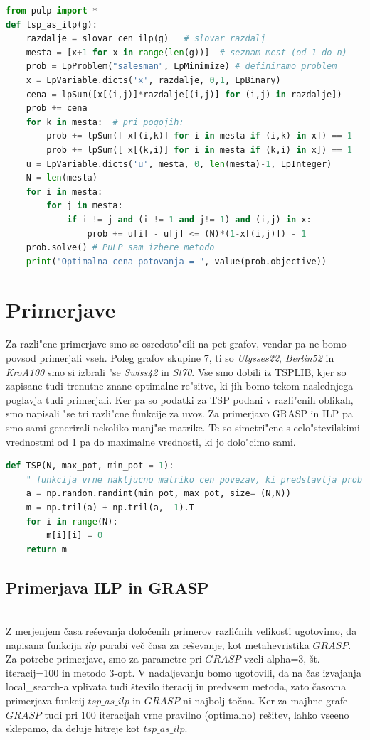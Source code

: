 \documentclass[12pt,a4paper]{amsart}
\theoremstyle{definition} %
\theoremstyle{plain} %
\begin{document}
\begin{lstlisting}[language=Python]
from pulp import *
def tsp_as_ilp(g):
    razdalje = slovar_cen_ilp(g)   # slovar razdalj 
    mesta = [x+1 for x in range(len(g))]  # seznam mest (od 1 do n)
    prob = LpProblem("salesman", LpMinimize) # definiramo problem
    x = LpVariable.dicts('x', razdalje, 0,1, LpBinary) 
    cena = lpSum([x[(i,j)]*razdalje[(i,j)] for (i,j) in razdalje]) 
    prob += cena
    for k in mesta:  # pri pogojih:
        prob += lpSum([ x[(i,k)] for i in mesta if (i,k) in x]) == 1  
        prob += lpSum([ x[(k,i)] for i in mesta if (k,i) in x]) == 1  
    u = LpVariable.dicts('u', mesta, 0, len(mesta)-1, LpInteger) 
    N = len(mesta)
    for i in mesta:  
        for j in mesta:
            if i != j and (i != 1 and j!= 1) and (i,j) in x:
                prob += u[i] - u[j] <= (N)*(1-x[(i,j)]) - 1
    prob.solve() # PuLP sam izbere metodo
    print("Optimalna cena potovanja = ", value(prob.objective))   
\end{lstlisting}



\section{Primerjave}
Za razli"cne primerjave smo se osredoto"cili na pet grafov, vendar pa ne bomo povsod primerjali vseh. Poleg grafov skupine 7, ti so \textit{Ulysses22}, \textit{Berlin52} in \textit{KroA100} smo si izbrali "se \textit{Swiss42} in \textit{St70}. Vse smo dobili iz TSPLIB, kjer so zapisane tudi trenutne znane optimalne re"sitve, ki jih bomo tekom naslednjega poglavja tudi primerjali. Ker pa so podatki za TSP podani v razli"cnih oblikah, smo napisali "se tri razli"cne funkcije za uvoz. Za primerjavo GRASP in ILP pa smo sami generirali nekoliko manj"se matrike. Te so simetri"cne s celo"stevilskimi vrednostmi od 1 pa do maximalne vrednosti, ki jo dolo"cimo sami. 

\begin{lstlisting}[language=Python]
def TSP(N, max_pot, min_pot = 1):
    " funkcija vrne nakljucno matriko cen povezav, ki predstavlja problem potujocega trgovca"
    a = np.random.randint(min_pot, max_pot, size= (N,N))
    m = np.tril(a) + np.tril(a, -1).T
    for i in range(N):
        m[i][i] = 0
    return m
\end{lstlisting}

\subsection{Primerjava ILP in GRASP} ~\\
Z merjenjem časa reševanja določenih primerov različnih velikosti ugotovimo, da napisana funkcija $ilp$ porabi več časa za reševanje, kot metahevristika $GRASP$. Za potrebe primerjave, smo za parametre pri $GRASP$ vzeli alpha=3, št. iteracij=100 in metodo 3-opt.
V nadaljevanju bomo ugotovili, da na čas izvajanja local\_search-a vplivata tudi število iteracij in predvsem metoda, zato časovna primerjava funkcij $ tsp\_as\_ilp$ in $GRASP$ ni najbolj točna. Ker za majhne grafe $GRASP$ tudi pri 100 iteracijah vrne pravilno (optimalno) rešitev,
lahko vseeno sklepamo, da deluje hitreje kot $ tsp\_as\_ilp$. 
\end{document}
